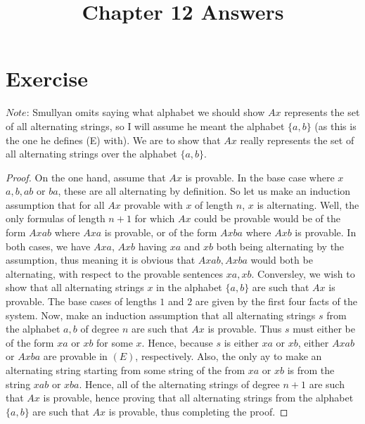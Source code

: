 \documentclass{article}
\title{Chapter 12 Answers}
\theoremstyle{definition}
\begin{document}
\maketitle

\section*{Exercise}
$Note$: Smullyan omits saying what alphabet we should show $Ax$ represents the set of all alternating strings, so I will assume he meant the alphabet 
$\{a,b\}$ (as this is the one he defines (E) with).\newline
We are to show that $Ax$ really represents the set of all alternating strings over the alphabet $\{a,b\}$.
\begin{proof} On the one hand, assume that $Ax$ is provable. In the base case where $x$ $a,b,ab$ or $ba$, these are all alternating by definition. 
So let us make an induction assumption that for all $Ax$ provable with $x$ of length $n$, $x$ is alternating. Well, the only formulas of length $n+1$ 
for which $Ax$ could be provable would be of the form $Axab$ where $Axa$ is provable, or of the form $Axba$ where $Axb$ is provable. In both cases, we 
have $Axa$, $Axb$ having $xa$ and $xb$ both being alternating by the assumption, thus meaning it is obvious that $Axab, Axba$ would both be alternating, 
with respect to the provable sentences $xa, xb$.\newline \newline
Conversley, we wish to show that all alternating strings $x$ in the alphabet $\{a,b\}$ are such that $Ax$ is provable. The base cases of lengths $1$ and $2$ 
are given by the first four facts of the system. Now, make an induction assumption that all alternating strings $s$ from the alphabet ${a,b}$ of degree $n$ 
are such that $Ax$ is provable. Thus $s$ must either be of the form $xa$ or $xb$ for some $x$. Hence, because $s$ is either $xa$ or $xb$, 
either $Axab$ or $Axba$ 
are provable in $(E)$, respectively. Also, the only ay to make an alternating string starting from some string of the from $xa$ or $xb$ is from the string 
$xab$ or $xba$. Hence, all of the alternating strings of degree $n+1$ are such that $Ax$ is provable, hence proving that all alternating strings 
from the alphabet $\{a,b\}$ are such that $Ax$ is provable, thus completing the proof.
\end{proof}
\end{document}

